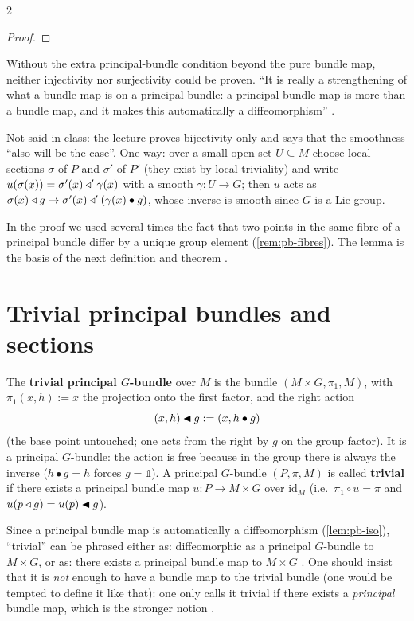 \begin{paracol}{2}
\begin{proof}
\end{proof}
Without the extra principal-bundle condition beyond the pure bundle map, neither injectivity nor surjectivity could be proven. ``It is really a strengthening of what a bundle map is on a principal bundle: a principal bundle map is more than a bundle map, and it makes this automatically a diffeomorphism''  .
\begin{coursenote}
Not said in class: the lecture proves bijectivity only and says that the smoothness ``also will be the case''. One way: over a small open set $U\subseteq M$ choose local sections $\sigma$ of $P$ and $\sigma'$ of $P'$ (they exist by local triviality) and write $u(\sigma(x))=\sigma'(x)\mathbin{\triangleleft}'\gamma(x)$ with a smooth $\gamma\colon U\to G$; then $u$ acts as $\sigma(x)\mathbin{\triangleleft} g\mapsto\sigma'(x)\mathbin{\triangleleft}'(\gamma(x)\bullet g)$, whose inverse is smooth since $G$ is a Lie group. 
\end{coursenote}
In the proof we used several times the fact that two points in the same fibre of a principal bundle differ by a unique group element (\cref{rem:pb-fibres}). The lemma is the basis of the next definition and theorem  .

\section{Trivial principal bundles and sections}\label{sec:pb-trivial}

\begin{definition}\label{def:pb-trivial}
The \textbf{trivial principal $G$-bundle} over $M$ is the bundle $(M\times G,\pi_1,M)$, with $\pi_1(x,h):=x$ the projection onto the first factor, and the right action
\[
  (x,h)\mathbin{\blacktriangleleft} g:=(x,h\bullet g)
\]
(the base point untouched; one acts from the right by $g$ on the group factor). It is a principal $G$-bundle: the action is free because in the group there is always the inverse ($h\bullet g=h$ forces $g=\mathbb 1$). A principal $G$-bundle $(P,\pi,M)$ is called \textbf{trivial} if there exists a principal bundle map $u\colon P\to M\times G$ over $\mathrm{id}_M$ (i.e.\ $\pi_1\circ u=\pi$ and $u(p\mathbin{\triangleleft} g)=u(p)\mathbin{\blacktriangleleft} g$).         
\end{definition}
Since a principal bundle map is automatically a diffeomorphism (\cref{lem:pb-iso}), ``trivial'' can be phrased either as: diffeomorphic as a principal $G$-bundle to $M\times G$, or as: there exists a principal bundle map to $M\times G$    . One should insist that it is \emph{not} enough to have a bundle map to the trivial bundle (one would be tempted to define it like that): one only calls it trivial if there exists a \emph{principal} bundle map, which is the stronger notion  .


\end{paracol}
